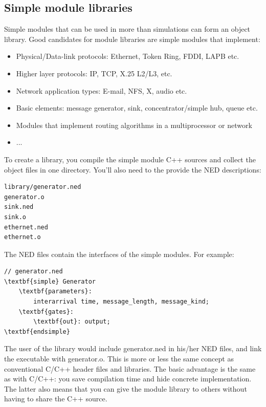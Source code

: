 \subsection{Simple module libraries}

Simple modules that can be used in more than simulations can form an
object library. Good candidates for module
libraries are simple
modules that implement:
\begin{itemize}
\item{Physical/Data-link protocols: Ethernet, Token Ring, FDDI, LAPB
    etc.}
\item{Higher layer protocols: IP, TCP, X.25 L2/L3, etc.}
\item{Network application types: E-mail, NFS, X, audio etc.}
\item{Basic elements: message generator, sink, concentrator/simple
    hub, queue etc.}
\item{Modules that implement routing algorithms in a multiprocessor or
    network}
\item{...}
\end{itemize}

To create a library, you compile the simple module C++ sources 
and collect the object files in one directory. You'll also need 
to the provide the NED descriptions:


\begin{Verbatim}[commandchars=\\\{\}]
library/generator.ned 
generator.o
sink.ned
sink.o 
ethernet.ned
ethernet.o
\end{Verbatim}
  


The NED files contain the interfaces of the
simple modules. For example:


\begin{Verbatim}[commandchars=\\\{\}]
// generator.ned
\textbf{simple} Generator
    \textbf{parameters}:  
        interarrival time, message_length, message_kind;
    \textbf{gates}:
        \textbf{out}: output;
\textbf{endsimple}
\end{Verbatim}
  
        
The user of the library would include generator.ned in his/her 
NED files, and link the executable with generator.o. This is 
more or less the same concept as conventional C/C++ header files 
and libraries. The basic advantage is the same as with C/C++: 
you save compilation time and hide concrete implementation. The 
latter also means that you can give the module library to others 
without having to share the C++ source.


